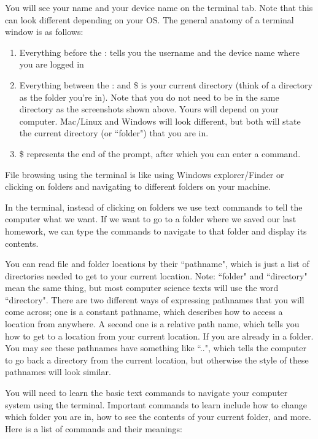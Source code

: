 You will see your name and your device name on the terminal tab. Note that this can look different depending on your OS. The general anatomy of a terminal window is as follows:

\begin{enumerate}
    \item Everything before the : tells you the username and the device name where you are logged in
    \item Everything between the : and \$ is your current directory (think of a directory as the folder you’re in). Note that you do not need to be in the same directory as the screenshots shown above. Yours will depend on your computer. Mac/Linux and Windows will look different, but both will state the current directory (or ``folder") that you are in.
    \item \$ represents the end of the prompt, after which you can enter a command.
\end{enumerate}


File browsing using the terminal is like using Windows explorer/Finder or clicking on folders and navigating to different folders on your machine.

In the terminal, instead of clicking on folders we use text commands to tell the computer what we want. If we want to go to a folder where we saved our last homework, we can type the commands to navigate to that folder and display its contents.

You can read file and folder locations by their ``pathname", which is just a list of directories needed to get to your current location. Note: ``folder" and ``directory" mean the same thing, but most computer science texts will use the word ``directory". There are two different ways of expressing pathnames that you will come across; one is a constant pathname, which describes how to access a location from anywhere. A second one is a relative path name, which tells you how to get to a location from your current location. If you are already in a folder. You may see these pathnames have something like ``..", which tells the computer to go back a directory from the current location, but otherwise the style of these pathnames will look similar. 

You will need to learn the basic text commands to navigate your computer system using the terminal. Important commands to learn include how to change which folder you are in, how to see the contents of your current folder, and more. Here is a list of commands and their meanings:

